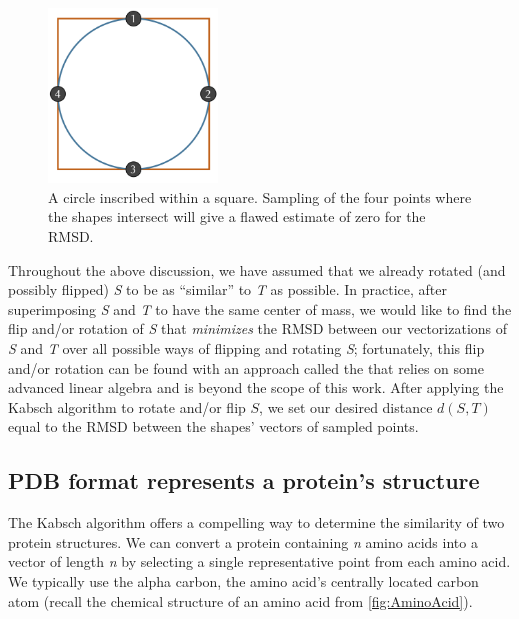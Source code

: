 \begin{figure}[h]
	\centering
	\mySfFamily
	\includegraphics[width = 0.4\textwidth]{../images/circle_square_undersampling.png}
	\caption{A circle inscribed within a square. Sampling of the four points where the shapes intersect will give a flawed estimate of zero for the RMSD.}
	\label{fig:circle_square_undersampling}
\end{figure}

Throughout the above discussion, we have assumed that we already rotated (and possibly flipped) \textit{S} to be as ``similar'' to \textit{T} as possible. In practice, after superimposing \textit{S} and \textit{T} to have the same center of mass, we would like to find the flip and/or rotation of \textit{S} that \textit{minimizes} the RMSD between our vectorizations of \textit{S} and \textit{T} over all possible ways of flipping and rotating \textit{S}; fortunately, this flip and/or rotation can be found with an approach called the  that relies on some advanced linear algebra and is beyond the scope of this work. After applying the Kabsch algorithm to rotate and/or flip $S$, we set our desired distance $d(S, T)$ equal to the RMSD between the shapes' vectors of sampled points.

\subsection{PDB format represents a protein's structure}

The Kabsch algorithm offers a compelling way to determine the similarity of two protein structures. We can convert a protein containing \textit{n} amino acids into a vector of length \textit{n} by selecting a single representative point from each amino acid. We typically use the alpha carbon, the amino acid's centrally located carbon atom (recall the chemical structure of an amino acid from \autoref{fig:AminoAcid}).

